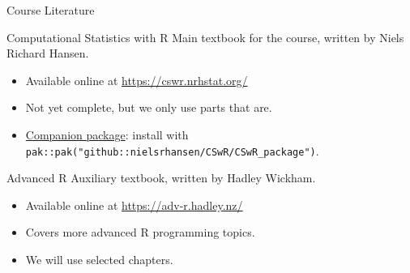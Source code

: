 \documentclass[
  ignorenonframetext,
  aspectratio=1610,
  onlytextwidth]{beamer}
\providecommand{\tightlist}{}
\begin{document}
\begin{frame}[fragile]{Course Literature}
\label{course-literature}
\begin{block}{Computational Statistics with R}
\label{computational-statistics-with-r}
Main textbook for the course, written by Niels Richard Hansen.

\begin{itemize}
\tightlist
\item
  Available online at \url{https://cswr.nrhstat.org/}
\item
  Not yet complete, but we only use parts that are.
\item
  \href{https://github.com/nielsrhansen/CSwR/tree/master/CSwR_package}{Companion
  package}: install with
  \texttt{pak::pak("github::nielsrhansen/CSwR/CSwR\_package")}.
\end{itemize}

\pause
\end{block}

\begin{block}{Advanced R}
\label{advanced-r}
Auxiliary textbook, written by Hadley Wickham.

\begin{itemize}
\tightlist
\item
  Available online at \url{https://adv-r.hadley.nz/}
\item
  Covers more advanced R programming topics.
\item
  We will use selected chapters.
\end{itemize}
\end{block}
\end{frame}
\end{document}

